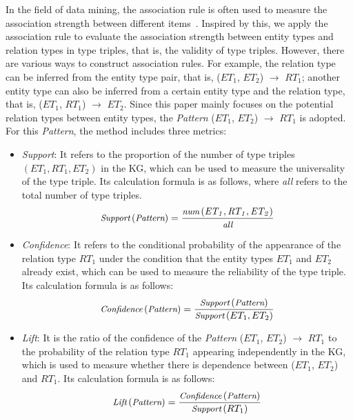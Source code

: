 In the field of data mining, the association rule is often used to measure the association strength between different items~\cite{asso1, asso2, asso3}.
Inspired by this, we apply the association rule to evaluate the association strength between entity types and relation types in type triples, that is, the validity of type triples.
However, there are various ways to construct association rules. 
For example, the relation type can be inferred from the entity type pair, that is, ($ET_{1}$, $ET_{2}$) $\rightarrow$ $RT_{1}$;
another entity type can also be inferred from a certain entity type and the relation type, that is, ($ET_{1}$, $RT_{1}$) $\rightarrow$ $ET_{2}$.
Since this paper mainly focuses on the potential relation types between entity types, the \textit{Pattern} ($ET_{1}$, $ET_{2}$) $\rightarrow$ $RT_{1}$ is adopted.
For this \textit{Pattern}, the method includes three metrics:

\begin{itemize}[leftmargin=*]
    \item \textit{Support}: It refers to the proportion of the number of type triples 
    $\mathit{(ET_{1}, RT_{1}, ET_{2})}$ in the KG, which can be used to measure the universality of the type triple.
    Its calculation formula is as follows, where \textit{all} refers to the total number of type triples.
    \[
    \small \textit{Support}\left( \textit{Pattern} \right) = \frac{\textit{num}\left( \mathit{ET_1, RT_1, ET_2} \right)}{\textit{all}}
    \]
    \item \textit{Confidence}: It refers to the conditional probability of the appearance of the relation type $RT_{1}$ under the condition that the entity types $ET_{1}$ and $ET_{2}$ already exist, which can be used to measure the reliability of the type triple. 
    Its calculation formula is as follows:
    \[
    \small \textit{Confidence}\left( \textit{Pattern} \right) = \frac{\textit{Support}\left( \textit{Pattern} \right)}{\textit{Support}\left( ET_1, ET_2 \right)}
    \]
    \item \textit{Lift}: It is the ratio of the confidence of the \textit{Pattern} ($ET_{1}$, $ET_{2}$) $\rightarrow$ $RT_{1}$ to the probability of the relation type $RT_{1}$ appearing independently in the KG, which is used to measure whether there is dependence between ($ET_{1}$, $ET_{2}$) and $RT_{1}$. 
    Its calculation formula is as follows:
    \[
    \small \textit{Lift}\left( \textit{Pattern} \right) = \frac{\textit{Confidence}\left( \textit{Pattern} \right)}{\textit{Support}\left( RT_1 \right)}
    \]
\end{itemize}

